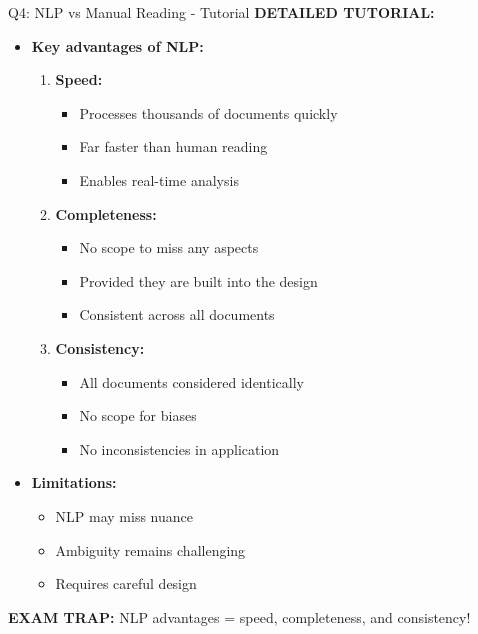 \documentclass[8pt]{beamer}
\begin{document}
\begin{frame}{Q4: NLP vs Manual Reading - Tutorial}
		\vspace{0.1cm}
		\textbf{DETAILED TUTORIAL:}
		\begin{itemize}
			\item \textbf{Key advantages of NLP:}
			\begin{enumerate}
				\item \textbf{Speed:}
				\begin{itemize}
					\item Processes thousands of documents quickly
					\item Far faster than human reading
					\item Enables real-time analysis
				\end{itemize}
				\item \textbf{Completeness:}
				\begin{itemize}
					\item No scope to miss any aspects
					\item Provided they are built into the design
					\item Consistent across all documents
				\end{itemize}
				\item \textbf{Consistency:}
				\begin{itemize}
					\item All documents considered identically
					\item No scope for biases
					\item No inconsistencies in application
				\end{itemize}
			\end{enumerate}
			\item \textbf{Limitations:}
			\begin{itemize}
				\item NLP may miss nuance
				\item Ambiguity remains challenging
				\item Requires careful design
			\end{itemize}
		\end{itemize}
		
		\textcolor{myred}{\textbf{EXAM TRAP:}} NLP advantages = \textcolor{myblue}{speed, completeness, and consistency}!
	\end{frame}
	
\end{document}
